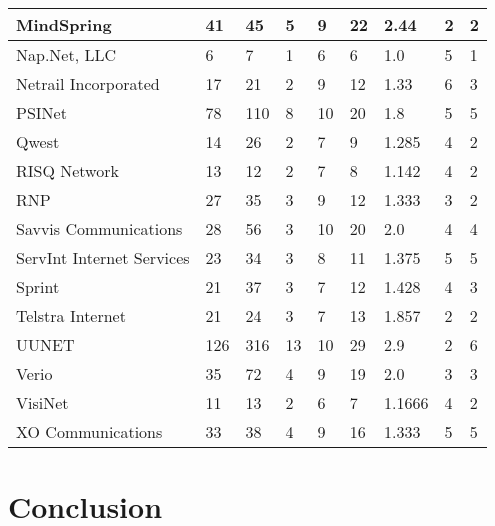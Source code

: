 \documentclass [12pt]{article}
\begin{document}
\begin{tabular}{ | l | l | l | l | l | l | l | l | l |  }
    MindSpring & 41 & 45 & 5 & 9 & 22 & 2.44 & 2 & 2\\ \hline
    Nap.Net, LLC & 6 & 7 & 1 & 6 & 6 & 1.0 & 5 & 1\\ \hline
    Netrail Incorporated & 17 & 21 & 2 & 9 & 12 & 1.33 & 6 & 3\\ \hline
    PSINet & 78 & 110 & 8 & 10 & 20 & 1.8 & 5 & 5\\ \hline
    Qwest & 14 & 26 & 2 & 7 & 9 & 1.285 & 4 & 2\\ \hline
    RISQ Network & 13 & 12 & 2 & 7 & 8 & 1.142 & 4 & 2\\ \hline
    RNP & 27 & 35 & 3 & 9 & 12 & 1.333 & 3 & 2\\ \hline
    Savvis Communications & 28 & 56 & 3 & 10 & 20 & 2.0 & 4 & 4\\ \hline
    ServInt Internet Services & 23 & 34 & 3 & 8 & 11 & 1.375 & 5 & 5\\ \hline
    Sprint & 21 & 37 & 3 & 7 & 12 & 1.428 & 4 & 3\\ \hline
    Telstra Internet & 21 & 24 & 3 & 7 & 13 & 1.857 & 2 & 2\\ \hline
    UUNET & 126 & 316 & 13 & 10 & 29 & 2.9 & 2 & 6\\ \hline
    Verio & 35 & 72 & 4 & 9 & 19 & 2.0 & 3 & 3\\ \hline
    VisiNet & 11 & 13 & 2 & 6 & 7 & 1.1666 & 4 & 2\\ \hline
    XO Communications & 33 & 38 & 4 & 9 & 16 & 1.333 & 5 & 5\\ \hline
  \end{tabular}
\section{Conclusion}


\end{document}
